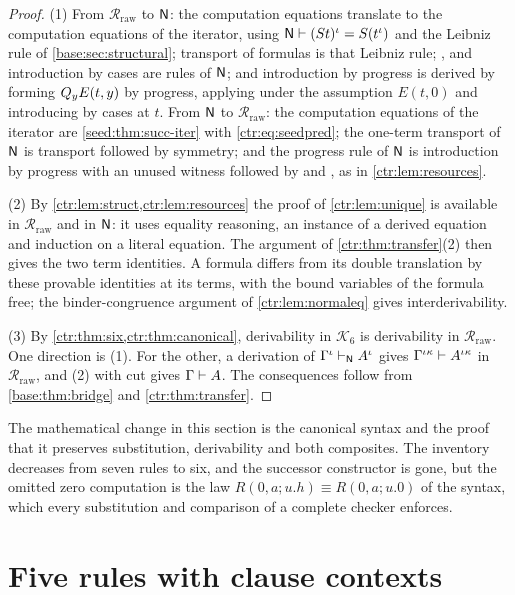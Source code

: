 \begin{proof}
(1) From $\mathcal R_{\mathrm{raw}}$ to $\mathsf{N}$: the computation equations translate to the
computation equations of the iterator, using $\mathsf{N}\vdash(S t)^\iota=S(t^\iota)$ and
the Leibniz rule of \cref{base:sec:structural}; transport of formulas is that Leibniz rule;
,  and introduction by cases are rules of $\mathsf{N}$; and introduction
by progress is derived by forming $Q_{y}E(t,y)$ by progress, applying  under
the assumption $E(t,0)$ and introducing by cases at $t$. From $\mathsf{N}$ to
$\mathcal R_{\mathrm{raw}}$: the computation equations of the iterator are
\cref{seed:thm:succ-iter} with \eqref{ctr:eq:seedpred}; the one-term transport of $\mathsf{N}$ is
transport followed by symmetry; and the progress rule of $\mathsf{N}$ is introduction by progress
with an unused witness followed by  and , as in
\cref{ctr:lem:resources}.

(2) By \cref{ctr:lem:struct,ctr:lem:resources} the proof of \cref{ctr:lem:unique} is
available in $\mathcal R_{\mathrm{raw}}$ and in $\mathsf{N}$: it uses equality reasoning, an
instance of a derived equation and induction on a literal equation. The argument of
\cref{ctr:thm:transfer}(2) then gives the two term identities. A formula differs from its
double translation by these provable identities at its terms, with the bound variables of
the formula free; the binder-congruence argument of \cref{ctr:lem:normaleq} gives
interderivability.

(3) By \cref{ctr:thm:six,ctr:thm:canonical}, derivability in $\mathcal K_6$ is derivability
in $\mathcal R_{\mathrm{raw}}$. One direction is (1). For the other, a derivation of
$\Gamma^\iota\vdash_{\mathsf{N}}A^\iota$ gives $\Gamma^{\iota\kappa}\vdash A^{\iota\kappa}$ in
$\mathcal R_{\mathrm{raw}}$, and (2) with cut gives $\Gamma\vdash A$. The consequences
follow from \cref{base:thm:bridge} and \cref{ctr:thm:transfer}.
\end{proof}

The mathematical change in this section is the canonical syntax and the proof that it
preserves substitution, derivability and both composites. The inventory decreases from
seven rules to six, and the successor constructor is gone, but the omitted
zero computation is the law $R(0,a;u.h)\equiv R(0,a;u.0)$ of the syntax, which every
substitution and comparison of a complete checker enforces.

\section{Five rules with clause contexts}\label{ctr:sec:five}

